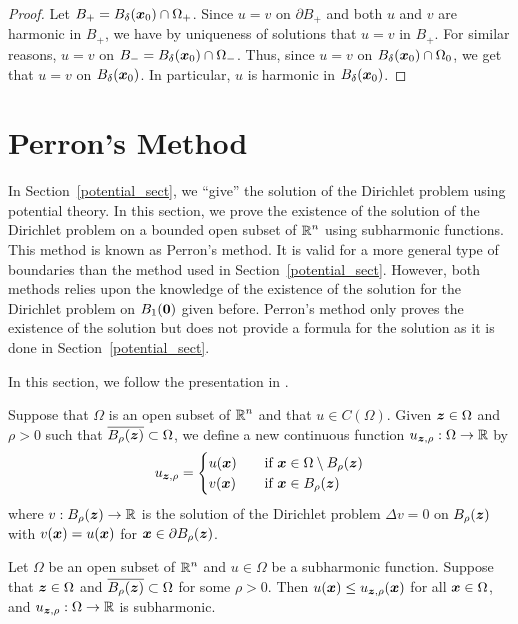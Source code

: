 \begin{proof}
Let $B_+ = B_\delta({\bm{x}}_0) \cap \Omega_+$.  Since $u=v$ on
$\partial B_+$ and both $u$ and $v$ are harmonic in $B_+$, we have by
uniqueness of solutions that $u=v$ in $B_+$.  For similar reasons,
$u = v$ on $B_- = B_\delta({\bm{x}}_0) \cap \Omega_-$.  Thus, 
since $u=v$ on $B_\delta({\bm{x}}_0) \cap \Omega_0$, we get that
$u=v$ on $B_\delta({\bm{x}}_0)$.  In particular, $u$ is harmonic in
$B_\delta({\bm{x}}_0)$.
\end{proof}

\section{Perron's Method}

In Section~\ref{potential_sect}, we ``give'' the solution of the
Dirichlet problem using potential theory.  In this section, we prove
the existence of the solution of the Dirichlet problem on a bounded
open subset of $\displaystyle \mathbb{R}^n$ using subharmonic functions.
This method is known as Perron's method.  It is valid for a more
general type of boundaries than the method used in
Section~\ref{potential_sect}.  However, both methods relies upon the
knowledge of the existence of the solution for the Dirichlet problem
on $B_1({\bm{0}})$ given before.  Perron's method only proves the
existence of the solution but does not provide a formula for the
solution as it is done in Section~\ref{potential_sect}.

In this section, we follow the presentation in \cite{J}.

\begin{defn}
Suppose that $\Omega$ is an open subset of $\displaystyle \mathbb{R}^n$ and that
$u \in C(\Omega)$.  Given ${\bm{z}} \in \Omega$ and $\rho >0$ such that
$\overline{B_{\rho}({\bm{z}})} \subset \Omega$, we define a new
continuous function $u_{{\bm{z}},\rho}:\Omega \to \mathbb{R}$ by
\[
u_{{\bm{z}},\rho} =
\begin{cases}
u({\bm{x}}) & \quad \text{if} \ {\bm{x}} \in \Omega \setminus B_{\rho}({\bm{z}}) \\
v({\bm{x}}) & \quad \text{if} \ {\bm{x}} \in B_{\rho}({\bm{z}})
\end{cases}
\]
where $v: B_{\rho}({\bm{z}}) \to \mathbb{R}$ is the solution of the Dirichlet
problem $\Delta v = 0$ on $B_{\rho}({\bm{z}})$ with $v({\bm{x}}) = u({\bm{x}})$
for ${\bm{x}} \in \partial B_{\rho}({\bm{z}})$.
\end{defn}

\begin{lemma} \label{PerronLem1}
Let $\Omega$ be an open subset of $\displaystyle \mathbb{R}^n$ and $u \in \Omega$ be a
subharmonic function.   Suppose that ${\bm{z}} \in \Omega$
and $\overline{B_{\rho}({\bm{z}})} \subset \Omega$ for some $\rho >0$.  Then
$u({\bm{x}}) \leq u_{{\bm{z}},\rho}({\bm{x}})$ for all ${\bm{x}} \in \Omega$,
and $u_{{\bm{z}},\rho}:\Omega \to \mathbb{R}$ is subharmonic.
\end{lemma}

